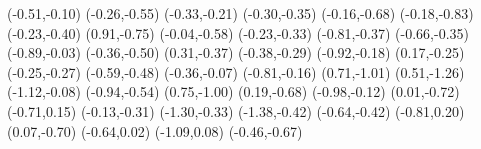 \psdot[](-0.51,-0.10)
\psdot[](-0.26,-0.55)
\psdot[](-0.33,-0.21)
\psdot[](-0.30,-0.35)
\psdot[](-0.16,-0.68)
\psdot[](-0.18,-0.83)
\psdot[](-0.23,-0.40)
\psdot[](0.91,-0.75)
\psdot[](-0.04,-0.58)
\psdot[](-0.23,-0.33)
\psdot[](-0.81,-0.37)
\psdot[](-0.66,-0.35)
\psdot[](-0.89,-0.03)
\psdot[](-0.36,-0.50)
\psdot[](0.31,-0.37)
\psdot[](-0.38,-0.29)
\psdot[](-0.92,-0.18)
\psdot[](0.17,-0.25)
\psdot[](-0.25,-0.27)
\psdot[](-0.59,-0.48)
\psdot[](-0.36,-0.07)
\psdot[](-0.81,-0.16)
\psdot[](0.71,-1.01)
\psdot[](0.51,-1.26)
\psdot[](-1.12,-0.08)
\psdot[](-0.94,-0.54)
\psdot[](0.75,-1.00)
\psdot[](0.19,-0.68)
\psdot[](-0.98,-0.12)
\psdot[](0.01,-0.72)
\psdot[](-0.71,0.15)
\psdot[](-0.13,-0.31)
\psdot[](-1.30,-0.33)
\psdot[](-1.38,-0.42)
\psdot[](-0.64,-0.42)
\psdot[](-0.81,0.20)
\psdot[](0.07,-0.70)
\psdot[](-0.64,0.02)
\psdot[](-1.09,0.08)
\psdot[](-0.46,-0.67)
